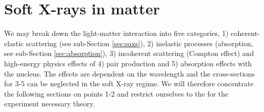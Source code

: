 \section{Soft X-rays in matter}\label{sec:light-matter-interaction}
We may break down the light-matter interaction into five categories, 1) coherent-elastic scattering (see sub-Section \ref{sec:saxs}), 2) inelastic processes (absorption, see sub-Section \ref{sec:absorption}), 3) incoherent scattering (Compton effect) and high-energy physics effects of 4) pair production and 5) absorption effects with the nucleus. The effects are dependent on the wavelength and the cross-sections for 3-5 can be neglected in the soft X-ray regime. We will therefore concentrate the following sections on points 1-2 and restrict ourselves to the for the experiment necessary theory.
%
%
%
